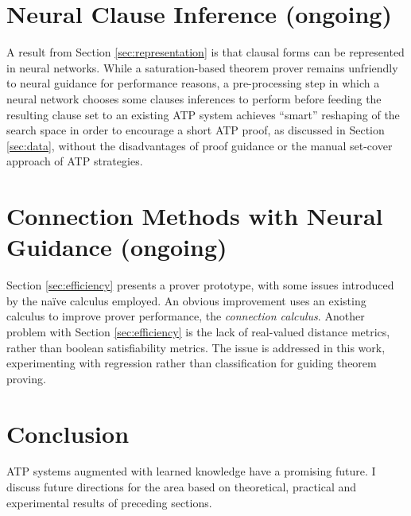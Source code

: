 \documentclass[a4paper]{article}
\begin{document}
\section{Neural Clause Inference (ongoing)}
A result from Section \ref{sec:representation} is that clausal forms can be represented in neural networks.
While a saturation-based theorem prover remains unfriendly to neural guidance for performance reasons, a pre-processing step in which a neural network chooses some clauses inferences to perform before feeding the resulting clause set to an existing ATP system achieves ``smart'' reshaping of the search space in order to encourage a short ATP proof, as discussed in Section \ref{sec:data}, without the disadvantages of proof guidance or the manual set-cover approach of ATP strategies.

\section{Connection Methods with Neural Guidance (ongoing)}
Section \ref{sec:efficiency} presents a prover prototype, with some issues introduced by the na\"ive calculus employed.
An obvious improvement uses an existing calculus to improve prover performance, the \emph{connection calculus}.
Another problem with Section \ref{sec:efficiency} is the lack of real-valued distance metrics, rather than boolean satisfiability metrics.
The issue is addressed in this work, experimenting with regression rather than classification for guiding theorem proving.

\section{Conclusion}
ATP systems augmented with learned knowledge have a promising future.
I discuss future directions for the area based on theoretical, practical and experimental results of preceding sections.

\printbibliography
\end{document}
